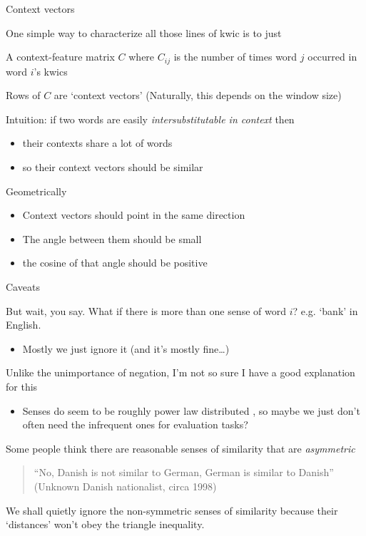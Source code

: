 \documentclass{hertieteaching}
\begin{document}
\begin{frame}[fragile]{Context vectors}

One simple way to characterize all those lines of kwic is to just  

A context-feature matrix $C$ where $C_{ij}$ is the number of times word $j$ occurred in word $i$'s kwics

Rows of $C$ are `context vectors' (Naturally, this depends on the window size)

Intuition: if two words are easily \textit{intersubstitutable in context} then 
\begin{itemize}
  \item their contexts share a lot of words
  \item so their context vectors should be similar
\end{itemize}

Geometrically
\begin{itemize}
  \item Context vectors should point in the same direction
  \item The angle between them should be small
  \item the cosine of that angle should be positive 
\end{itemize}

\end{frame}
\begin{frame}[fragile]{Caveats}

But wait, you say. What if there is more than one sense of word $i$? e.g. `bank' in English.
\begin{itemize}
  \item Mostly we just ignore it (and it's mostly fine\ldots)
\end{itemize}
Unlike the unimportance of negation, I'm not so sure I have a good explanation for this
\begin{itemize}
  \item Senses do seem to be roughly power law distributed \parencite{Zipf1945}, so maybe we just don't often need the infrequent ones for evaluation tasks?
\end{itemize}

\pause

Some people think there are reasonable senses of similarity that are \textit{asymmetric}

\smallskip
\begin{quote}
``No, Danish is not similar to German, German is similar to Danish''\\
\hfill (Unknown Danish nationalist, circa 1998)
\end{quote}

We shall quietly ignore the non-symmetric senses of similarity because their `distances' won't obey the triangle inequality.


\end{frame}
\end{document}
